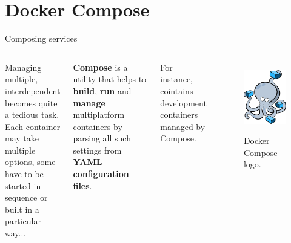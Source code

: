 
\section{Docker Compose}
\graphicspath{{figs/section3/}}

\begin{frame}{Composing services}
	\begin{columns}
		Managing multiple, interdependent  becomes quite a tedious task.\\
    \bigskip
		Each container may take multiple options, some have to be started in sequence or built in a particular way...
		\begin{block}{}
			\centering
			\textbf{Compose} is a utility that helps to \textbf{build}, \textbf{run} and \textbf{manage} multiplatform containers by parsing all such settings from \textbf{YAML configuration files}.
		\end{block}
    For instance,  cointains development containers managed by Compose.

		\begin{figure}
			\centering
			\includegraphics[scale=.25]{composeLogo.png}
			\label{fig:compose}
			\caption{Docker Compose logo.}
		\end{figure}
	\end{columns}
\end{frame}

